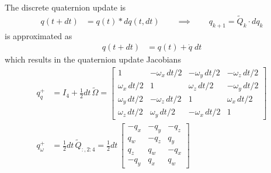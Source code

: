 The discrete quaternion update is %
\begin{align}
    q(t + dt) &= q(t) * dq(t,dt) 
    \qquad \implies
    \qquad q_{k+1} = \tilde Q_k \cdot dq_k
\end{align}
is approximated as 
\begin{align}
    q(t + dt) &= q(t) + \dot q \; dt
\end{align}
which results in the quaternion update Jacobians
\begin{align}
    q_q^+ &= I_4 + \frac{1}{2} dt \,\tilde \Omega =\begin{bmatrix}
        1 & -\omega_x \,dt/2 & -\omega_y \,dt/2 & -\omega_z \,dt/2 \\
        \omega_x \,dt/2 & 1 & \omega_z \,dt/2 & -\omega_y \,dt/2 \\
        \omega_y \,dt/2 & -\omega_z \,dt/2 & 1 & \omega_x \,dt/2 \\
        \omega_z \,dt/2 & \omega_y \,dt/2 & -\omega_x\,dt/2 & 1 
    \end{bmatrix}    
    \\
    q_\omega^+ &= \frac{1}{2} dt \, \tilde Q_{:, 2:4} = \frac{1}{2} dt \, \begin{bmatrix}
        -q_x & -q_y & -q_z \\
        q_w & -q_z & q_y \\
        q_z & q_w & -q_x \\
        -q_y & q_x & q_w
    \end{bmatrix} 
\end{align}


